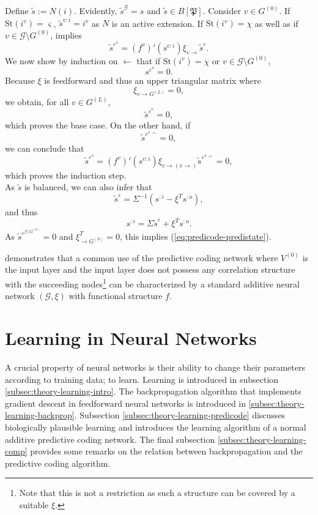 \documentclass[a4paper,11pt]{report}
\newcommand{\const}{\varsigma} %
\newcommand{\var}{\chi} %
\newcommand{\St}{\text{St}}
\begin{document}
\begin{Bew}
Define $\tilde{s}:=N(i)$. Evidently, $\tilde{s}^{\mathcal{G}}=s$ and $\tilde{s}\in B[\mathfrak{P}]$. Consider $v\in G^{(0)}$. If $\St(i^v)=\const$, $\tilde{s}^{v:i}=i^v$ as $N$ is an active extension. If $\St(i^v)=\var$ as well as if $v\in\mathcal{G}\setminus G^{(0)}$,  implies
\[
\tilde{s}^{\varepsilon^v}=\left(f^v\right)'(s^{v:i})\xi_{v\to}\tilde{s}^{\varepsilon}.
\]
We now show by induction on $\leftarrow$ that if $\St(i^v)=\var$ or $v\in\mathcal{G}\setminus G^{(0)}$,
\[
s^{\varepsilon^v}=0.
\]
Because $\xi$ is feedforward and thus an upper triangular matrix where
\[
\xi_{v\to G^{(L)}}=0,
\]
we obtain, for all $v\in G^{(L)}$,
\[
\tilde{s}^{\varepsilon^v}=0,
\]
which proves the base case.
On the other hand, if
\[
\tilde{s}^{\varepsilon^{v\to}}=0,
\]
we can conclude that
\[
\tilde{s}^{\varepsilon^{v}}=\left(f^v\right)'(s^{v:i})\xi_{v\to(v\to)}\tilde{s}^{\varepsilon^{v\to}}=0,
\]
which proves the induction step.\\
As $\tilde{s}$ is balanced, we can also infer that
\[
\tilde{s}^{\varepsilon}=\Sigma^{-1}(s^{:i}-\xi^Ts^{:o}),
\]
and thus
\[
s^{:i}=\Sigma\tilde{s}^{\varepsilon}+\xi^Ts^{:o}.
\]
As $\tilde{s}^{\varepsilon^{\mathcal{G}\setminus G^{(0)}}}=0$ and $\xi^{T}_{\to G^{(0)}}=0$, this implies (\ref{eq:predicode-predistate}).
\end{Bew}

\begin{Par}
 demonstrates that a common use of the predictive coding network where $V^{(0)}$ is the input layer and the input layer does not possess any correlation structure with the succeeding nodes\footnote{
Note that this is not a restriction as such a structure can be covered by a suitable $\xi$.} can be characterized by a standard additive neural network $(\mathcal{G},\xi)$ with functional structure $f$.
\end{Par}

\section{Learning in Neural Networks}\label{sec:theory-learning}

\begin{Par}
A crucial property of neural networks is their ability to change their parameters according to training data; to learn. Learning is introduced in subsection \ref{subsec:theory-learning-intro}. The backpropagation algorithm that implements gradient descent in feedforward neural networks is introduced in \ref{subsec:theory-learning-backprop}. Subsection \ref{subsec:theory-learning-predicode} discusses biologically plausible learning and introduces the learning algorithm of a normal additive predictive coding network. The final subsection \ref{subsec:theory-learning-comp} provides some remarks on the relation between backpropagation and the predictive coding algorithm.
\end{Par}
\end{document}
